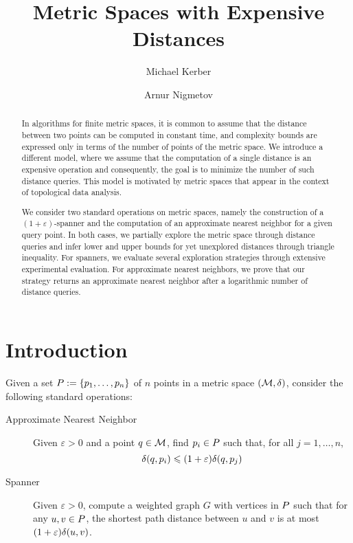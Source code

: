 \documentclass{ws-ijcga}
\title{Metric Spaces with Expensive Distances}
\author{Michael Kerber}
\author{Arnur Nigmetov}
\renewcommand{\leq}{\leqslant}
\newcommand{\eps}{\varepsilon}
\begin{document}
\maketitle

\begin{abstract}
In algorithms for finite metric spaces, it is common
to assume that the distance between two points
can be computed in constant time, and complexity
bounds are expressed only in terms of the number
of points of the metric space.
We introduce a different model, where we assume
that the computation of a single distance is
an expensive operation and consequently, the goal is
to minimize the number of such distance queries.
This model is motivated by metric spaces
that appear in the context of topological data analysis.

We consider two standard operations on metric spaces,
namely the construction of a $(1+\eps)$-spanner
and the computation of an approximate nearest
neighbor for a given query point.
In both cases, we partially explore the metric space
through distance queries and infer lower and upper bounds
for yet unexplored distances through triangle inequality.
For spanners, we evaluate several exploration strategies
through extensive experimental evaluation.
For approximate nearest neighbors, we prove that our
strategy returns an approximate nearest neighbor
after a logarithmic number of distance queries.
\end{abstract}

\section{Introduction}

Given a set $P:=\{p_1,\ldots,p_n\}$ of $n$ points
in a metric space $(\mathcal{M},\delta)$, 
consider the following standard operations:

\begin{description}
\item[Approximate Nearest Neighbor] Given $\eps>0$ and a point $q\in\mathcal{M}$,
find $p_i\in P$ such that, for all $j=1,\ldots,n$,
\[\dist(q,p_i)\leq(1+\eps)\dist(q,p_j)\]

\item[Spanner] Given $\eps>0$, compute a weighted graph $G$ with vertices in $P$
such that for any $u,v\in P$, the shortest path distance between $u$ and $v$
is at most $(1+\eps)\dist(u,v)$.
\end{description}
\end{document}
